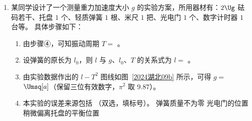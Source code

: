\documentclass[\gkver]{gaokaozhenti}
\begin{document}
\begin{enumerate}
{可知 $ y - x $ 图像斜率大小等于折射率，即 $ n = \frac{44}{28} \approx 1.57 $

（3）根据（2）中数据处理方法可知若描画的半圆弧轮廓线半径略大于玻璃砖的实际半径，则折射率的测量结果不变。
}
\item
某同学设计了一个测量重力加速度大小 $ g $ 的实验方案，所用器材有：$ 2\Ug $ 砝码若干、托盘 $ 1 $ 个、轻质弹簧 $ 1 $ 根、米尺 $ 1 $ 把、光电门 $ 1 $ 个、数字计时器 $ 1 $ 台等。
具体步骤如下：
\begin{enumerate}
	\item 
	由步骤④，可知振动周期 $ T =$ 。
	
	\item
	设弹簧的原长为 $ l_{0} $，则 $ l $ 与 $ g $、$ l_{0} $、$ T $ 的关系式为 $ l =$ 。
	
	\item
	由实验数据作出的 $ l - T^{2} $ 图线如图~\ref{2024湖北09b} 所示，可得 $ g =$  $\Umsq[a]$（保留三位有效数字，$ \pi^{2} $ 取 $ 9.87 $）。
	
	\item
	本实验的误差来源包括 （双选，填标号）。
	{弹簧质量不为零}
	{光电门的位置稍微偏离托盘的平衡位置}
	

\end{enumerate}
\end{enumerate}
\end{document}
